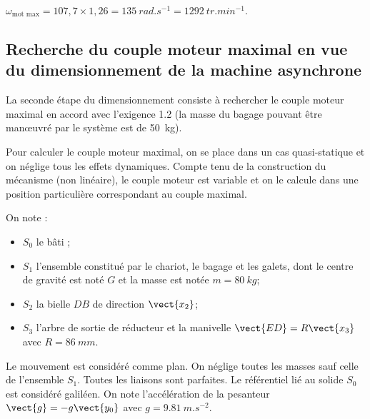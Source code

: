 \ifprof
\begin{corrige}
$\omega_{\text{mot max}}=107,7\times 1,26 = \SI{135}{rad.s^{-1}}=\SI{1292}{tr.min^{-1}}$.
\end{corrige}
\else
\fi

\subsection*{Recherche du couple moteur maximal en vue du dimensionnement de la machine asynchrone}




\begin{obj}
La seconde étape du dimensionnement consiste à rechercher le couple moteur maximal en accord avec
l’exigence 1.2 (la masse du bagage pouvant être manœuvré par le système est de \SI{50}{kg}).
\end{obj}


\ifprof
\else


Pour calculer le couple moteur maximal, on se place dans un cas quasi-statique et on néglige tous les effets
dynamiques. Compte tenu de la construction du mécanisme (non linéaire), le couple moteur est variable et on
le calcule dans une position particulière correspondant au couple maximal.



On note :
\begin{itemize}
\item $S_0$ le bâti ;
\item $S_1$ l’ensemble constitué par le chariot, le bagage et les galets, dont le centre de gravité est noté $G$ et la masse est notée $m=\SI{80}{kg}$;
\item $S_2$ la bielle $DB$ de direction $\vect{x_2}$;
\item $S_3$ l’arbre de sortie de réducteur et la manivelle $\vect{ED}=R\vect{x_3}$ avec $R=\SI{86}{mm}$.
\end{itemize}
Le mouvement est considéré comme plan. On néglige toutes les masses sauf celle de l’ensemble $S_1$. Toutes les liaisons sont parfaites. Le référentiel lié au solide $S_0$ est considéré galiléen. On note l’accélération de la pesanteur $\vect{g}=-g\vect{y_0}$ avec $g=\SI{9,81}{m.s^{-2}}$.

